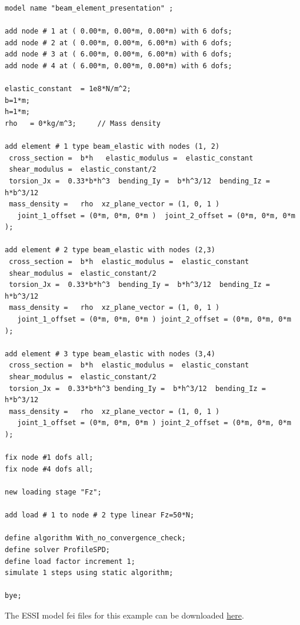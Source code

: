 \documentclass[fleqn,11pt]{article}
\begin{document}
%
\begin{lstlisting}
model name "beam_element_presentation" ;

add node # 1 at ( 0.00*m, 0.00*m, 0.00*m) with 6 dofs;
add node # 2 at ( 0.00*m, 0.00*m, 6.00*m) with 6 dofs;
add node # 3 at ( 6.00*m, 0.00*m, 6.00*m) with 6 dofs;
add node # 4 at ( 6.00*m, 0.00*m, 0.00*m) with 6 dofs;

elastic_constant  = 1e8*N/m^2; 
b=1*m;
h=1*m;
rho   = 0*kg/m^3;     // Mass density

add element # 1 type beam_elastic with nodes (1, 2) 
 cross_section =  b*h   elastic_modulus =  elastic_constant
 shear_modulus =  elastic_constant/2
 torsion_Jx =  0.33*b*h^3  bending_Iy =  b*h^3/12  bending_Iz =  h*b^3/12
 mass_density =   rho  xz_plane_vector = (1, 0, 1 ) 
   joint_1_offset = (0*m, 0*m, 0*m )  joint_2_offset = (0*m, 0*m, 0*m );

add element # 2 type beam_elastic with nodes (2,3) 
 cross_section =  b*h  elastic_modulus =  elastic_constant
 shear_modulus =  elastic_constant/2
 torsion_Jx =  0.33*b*h^3  bending_Iy =  b*h^3/12  bending_Iz =  h*b^3/12
 mass_density =   rho  xz_plane_vector = (1, 0, 1 ) 
   joint_1_offset = (0*m, 0*m, 0*m ) joint_2_offset = (0*m, 0*m, 0*m );

add element # 3 type beam_elastic with nodes (3,4) 
 cross_section =  b*h  elastic_modulus =  elastic_constant
 shear_modulus =  elastic_constant/2
 torsion_Jx =  0.33*b*h^3 bending_Iy =  b*h^3/12  bending_Iz =  h*b^3/12
 mass_density =   rho  xz_plane_vector = (1, 0, 1 ) 
   joint_1_offset = (0*m, 0*m, 0*m ) joint_2_offset = (0*m, 0*m, 0*m );

fix node #1 dofs all;
fix node #4 dofs all;

new loading stage "Fz";

add load # 1 to node # 2 type linear Fz=50*N;

define algorithm With_no_convergence_check;
define solver ProfileSPD;
define load factor increment 1;
simulate 1 steps using static algorithm;

bye;
\end{lstlisting}

The    ESSI   model   fei   files   for   this   example   can   be   downloaded
\href{https://github.com/BorisJeremic/Real-ESSI-Examples/blob/master/model_fei_file/beam_elastic_presentation_example/beam_elastic_presentation_example.tgz?raw=true}{here}.
\end{document}
